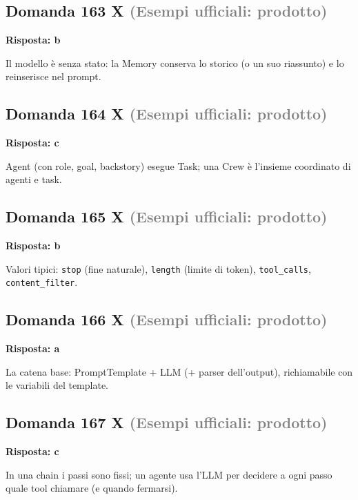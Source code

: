 \documentclass[a4paper,11pt]{article}
\begin{document}
\subsection*{Domanda 163 X \hfill {\small \textcolor{gray}{(Esempi ufficiali: prodotto)}}}
\textbf{Risposta: b}\par
Il modello è senza stato: la Memory conserva lo storico (o un suo riassunto) e lo reinserisce nel prompt.



\subsection*{Domanda 164 X \hfill {\small \textcolor{gray}{(Esempi ufficiali: prodotto)}}}
\textbf{Risposta: c}\par
Agent (con role, goal, backstory) esegue Task; una Crew è l'insieme coordinato di agenti e task.



\subsection*{Domanda 165 X \hfill {\small \textcolor{gray}{(Esempi ufficiali: prodotto)}}}
\textbf{Risposta: b}\par
Valori tipici: \texttt{stop} (fine naturale), \texttt{length} (limite di token), \texttt{tool\_calls}, \texttt{content\_filter}.



\subsection*{Domanda 166 X \hfill {\small \textcolor{gray}{(Esempi ufficiali: prodotto)}}}
\textbf{Risposta: a}\par
La catena base: PromptTemplate + LLM (+ parser dell'output), richiamabile con le variabili del template.



\subsection*{Domanda 167 X \hfill {\small \textcolor{gray}{(Esempi ufficiali: prodotto)}}}
\textbf{Risposta: c}\par
In una chain i passi sono fissi; un agente usa l'LLM per decidere a ogni passo quale tool chiamare (e quando fermarsi).
\end{document}
